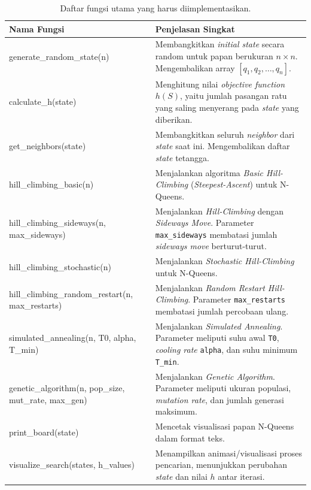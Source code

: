 \documentclass[12pt,a4paper]{article}
\begin{document}
\begin{table}[H]
\small
\centering
\caption{Daftar fungsi utama yang harus diimplementasikan.}
\label{tab:fungsi}
\renewcommand{\arraystretch}{1.3}
\begin{tabularx}{\textwidth}{|>{\ttfamily\small}l|X|}
\hline
\textbf{Nama Fungsi} & \textbf{Penjelasan Singkat} \\
\hline
generate\_random\_state(n) & Membangkitkan \textit{initial state} secara random untuk papan berukuran $n \times n$. Mengembalikan array $[q_1, q_2, \ldots, q_n]$. \\
\hline
calculate\_h(state) & Menghitung nilai \textit{objective function} $h(S)$, yaitu jumlah pasangan ratu yang saling menyerang pada \textit{state} yang diberikan. \\
\hline
get\_neighbors(state) & Membangkitkan seluruh \textit{neighbor} dari \textit{state} saat ini. Mengembalikan daftar \textit{state} tetangga. \\
\hline
hill\_climbing\_basic(n) & Menjalankan algoritma \textit{Basic Hill-Climbing} (\textit{Steepest-Ascent}) untuk N-Queens. \\
\hline
hill\_climbing\_sideways(n, max\_sideways) & Menjalankan \textit{Hill-Climbing} dengan \textit{Sideways Move}. Parameter \texttt{max\_sideways} membatasi jumlah \textit{sideways move} berturut-turut. \\
\hline
hill\_climbing\_stochastic(n) & Menjalankan \textit{Stochastic Hill-Climbing} untuk N-Queens. \\
\hline
hill\_climbing\_random\_restart(n, max\_restarts) & Menjalankan \textit{Random Restart Hill-Climbing}. Parameter \texttt{max\_restarts} membatasi jumlah percobaan ulang. \\
\hline
simulated\_annealing(n, T0, alpha, T\_min) & Menjalankan \textit{Simulated Annealing}. Parameter meliputi suhu awal \texttt{T0}, \textit{cooling rate} \texttt{alpha}, dan suhu minimum \texttt{T\_min}. \\
\hline
genetic\_algorithm(n, pop\_size, mut\_rate, max\_gen) & Menjalankan \textit{Genetic Algorithm}. Parameter meliputi ukuran populasi, \textit{mutation rate}, dan jumlah generasi maksimum. \\
\hline
print\_board(state) & Mencetak visualisasi papan N-Queens dalam format teks. \\
\hline
visualize\_search(states, h\_values) & Menampilkan animasi/visualisasi proses pencarian, menunjukkan perubahan \textit{state} dan nilai $h$ antar iterasi. \\
\hline
\end{tabularx}
\end{table}
\end{document}
